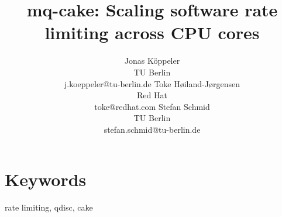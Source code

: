 \documentclass[letterpaper]{article}
\title{mq-cake: Scaling software rate limiting across CPU cores}
\author{Jonas Köppeler\\TU Berlin \\j.koeppeler@tu-berlin.de \And Toke H\o{}iland-J\o{}rgensen\\Red Hat\\toke@redhat.com \And Stefan Schmid \\ TU Berlin\\stefan.schmid@tu-berlin.de
}
\begin{document}
\maketitle

\section{Keywords}
rate limiting, qdisc, cake









\balance

\end{document}
